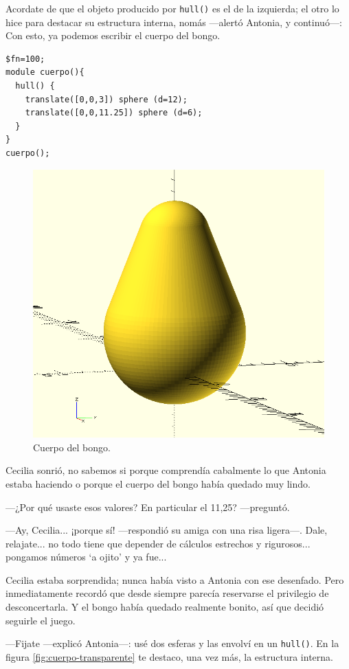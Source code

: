     \guillemotright Acordate de que el objeto producido por
    \lstinline!hull()! es el de la izquierda; el otro lo hice para
    destacar su estructura interna, nomás ---alertó Antonia, y
    continuó---: Con esto, ya podemos escribir el cuerpo del bongo.

    \begin{lstlisting}
$fn=100;
module cuerpo(){
  hull() {
    translate([0,0,3]) sphere (d=12);
    translate([0,0,11.25]) sphere (d=6);
  }
}
cuerpo();
    \end{lstlisting}%

    \begin{figure}[ht]
      \centering
  \includegraphics[width=.7\textwidth]{imagenes/cuerpo}      
      \caption{Cuerpo del bongo.}
      \label{fig:cuerpo-bongo}
    \end{figure}


    Cecilia sonrió, no sabemos si porque comprendía cabalmente lo que
    Antonia estaba haciendo o porque el cuerpo del bongo había quedado
    muy lindo.

    ---¿Por qué usaste esos valores? En particular el 11,25?
    ---pre\-gun\-tó.

    ---Ay, Cecilia... ¡porque sí! ---respondió su amiga con una risa
    ligera---. Dale, relajate... no todo tiene que depender de
    cálculos estrechos y rigurosos... pongamos números `a ojito' y ya
    fue...

    Cecilia estaba sorprendida; nunca había visto a Antonia con ese
    desenfado. Pero inmediatamente recordó que desde siempre parecía
    reservarse el privilegio de desconcertarla. Y el bongo había
    quedado realmente bonito, así que decidió seguirle el juego.

    ---Fijate ---explicó Antonia---: usé dos esferas y las envolví en
    un \lstinline!hull()!. En la figura \ref{fig:cuerpo-transparente}
    te destaco, una vez más, la estructura interna.

